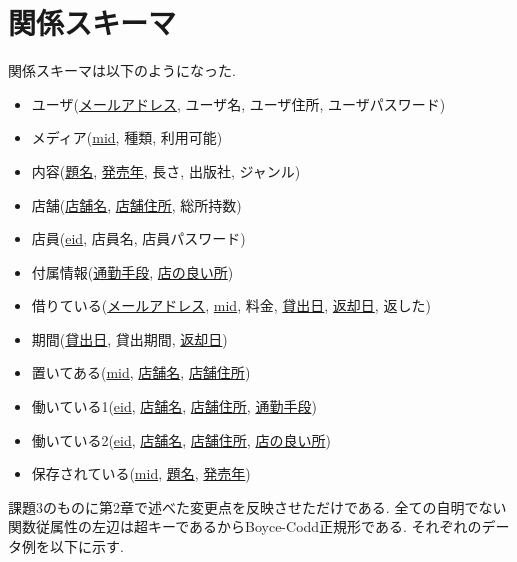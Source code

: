 \documentclass{jarticle}
\begin{document}
\section{関係スキーマ}
関係スキーマは以下のようになった.
\begin{itemize}
\item ユーザ(\underline{メールアドレス}, ユーザ名, ユーザ住所, ユーザパスワード)
\item メディア(\underline{mid}, 種類, 利用可能)
\item 内容(\underline{題名}, \underline{発売年}, 長さ, 出版社, ジャンル)
\item 店舗(\underline{店舗名}, \underline{店舗住所}, 総所持数)
\item 店員(\underline{eid}, 店員名, 店員パスワード)
\item 付属情報(\underline{通勤手段}, \underline{店の良い所})
\item 借りている(\underline{メールアドレス}, \underline{mid}, 料金, \underline{貸出日}, \underline{返却日}, 返した)
\item 期間(\underline{貸出日}, 貸出期間, \underline{返却日})
\item 置いてある(\underline{mid}, \underline{店舗名}, \underline{店舗住所})
\item 働いている1(\underline{eid}, \underline{店舗名}, \underline{店舗住所}, \underline{通勤手段})
\item 働いている2(\underline{eid}, \underline{店舗名}, \underline{店舗住所}, \underline{店の良い所})
\item 保存されている(\underline{mid}, \underline{題名}, \underline{発売年})
\end{itemize}
課題3のものに第2章で述べた変更点を反映させただけである. 全ての自明でない関数従属性の左辺は超キーであるからBoyce-Codd正規形である. それぞれのデータ例を以下に示す.
\end{document}
